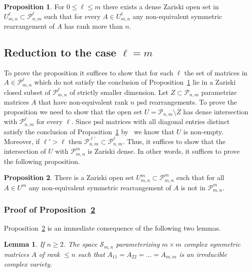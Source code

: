 \documentclass{article}
\newtheorem{Lemma}{Lemma}
\theoremstyle{definition}
\newtheorem{Proposition}{Proposition}
\renewcommand{\P}{\mathcal{P}}
\renewcommand{\|}{|}
\begin{document}
\begin{Proposition} \label{prop.rearrangement}
For $0 \leq \ell \leq m$ there exists a dense Zariski open set in $U^{\ell}_{m,n} \subset \mathcal{P}_{n,m}^{\ell}$
such that for every $A \in U^{\ell}_{m,n}$ any non-equivalent symmetric rearrangement of $A$ 
has rank more than $n$.
\end{Proposition}



\subsection{Reduction to the case $\ell = m$}\label{sec:relaxationtom-1}
To prove the proposition it suffices to show that for each $\ell$ the set of matrices in $A \in \mathcal{P}^{\ell}_{m,n}$
which do not satisfy the conclusion of Proposition~\ref{prop.rearrangement} lie in a Zariski closed subset of 
$\mathcal{P}^{\ell}_{m,n}$ of strictly smaller dimension. Let $Z \subset \mathcal{P}_{n,m}$ parametrize matrices $A$ that have non-equivalent rank $n$ psd rearrangements. To prove the proposition we need to show that 
the open set $U =\mathcal{P}_{n,m} \setminus\overline{Z}$ has dense intersection with $\mathcal{P}^{\ell}_{n,m}$
for every $\ell$.
Since psd matrices with all diagonal entries distinct 
satisfy the conclusion of Proposition~\ref{prop.rearrangement} by~\cite[Theorem 3.2]{bendory2024beltway} we know
that $U$ is non-empty. Moreover, if $\ell' > \ell$ then $\mathcal{P}^{\ell'}_{n,m} \subset \P^{\ell}_{n,m}$.
Thus, it suffices to show that the intersection of $U$ with $\mathcal{P}^{m}_{m,n}$ is Zariski dense.
In other words, it suffices to prove the following proposition.
\begin{Proposition} \label{prop.pmn}
    There is a Zariski open set $U^{m}_{m,n} \subset \mathcal{P}^{m}_{m,n}$ such that for all $A \in U^{m}$ any non-equivalent symmetric rearrangement of $A$ is not in $\mathcal{P}^{m}_{m,n}$.
\end{Proposition}
\subsubsection{Proof of Proposition~\ref{prop.pmn}}
Proposition~\ref{prop.pmn} is an immediate consequence of the following two lemmas.


\begin{Lemma}\label{lem:Smnirred}
If $n \geq 2$. The space $\mathcal{S}_{m,n}$ parameterizing $m\times m$ complex symmetric matrices $A$  of rank $\leq n$ 
such that $A_{11} = A_{22} = \ldots  = A_{m,m}$
is an irreducible complex variety.
\end{Lemma}
\end{document}
